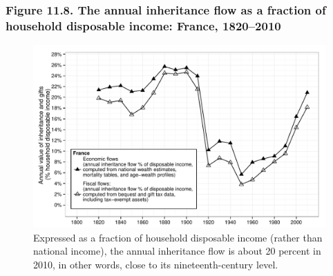 \documentclass[t]{beamer}\usepackage[]{graphicx}\usepackage[]{color}
\newenvironment{knitrout}{}{} %
\begin{document}
\begin{frame}[label=Figure_11_8]
\frametitle{Figure 11.8. The annual inheritance flow as a fraction of household disposable income: France, 1820--2010}
\begin{figure}[t]
\begin{minipage}[b]{\textwidth}
\centering
\begin{knitrout}\footnotesize
{}\color{fgcolor}

{\centering \includegraphics[width=1\linewidth]{figures/bw/Figure_11_8} 

}



\end{knitrout}
\caption{Expressed as a fraction of household disposable income (rather than national income), the annual inheritance flow is about 20 percent in 2010, in other words, close to its nineteenth-century level.}
\end{minipage}
\end{figure}
\end{frame}
\end{document}
